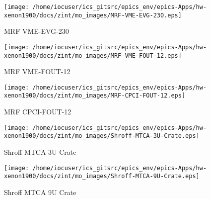 \noindent
\vspace{1.4cm}
\begin{minipage}{.2\textwidth}
\begin{center}
\texttt{[image: /home/iocuser/ics\_gitsrc/epics\_env/epics-Apps/hw-xenon1900/docs/zint/mo\_images/MRF-VME-EVG-230.eps]}
\end{center}
\end{minipage}
\begin{minipage}{.7\textwidth}
MRF VME-EVG-230
\end{minipage}


\noindent
\vspace{1.4cm}
\begin{minipage}{.2\textwidth}
\begin{center}
\texttt{[image: /home/iocuser/ics\_gitsrc/epics\_env/epics-Apps/hw-xenon1900/docs/zint/mo\_images/MRF-VME-FOUT-12.eps]}
\end{center}
\end{minipage}
\begin{minipage}{.7\textwidth}
MRF VME-FOUT-12
\end{minipage}


\noindent
\vspace{1.4cm}
\begin{minipage}{.2\textwidth}
\begin{center}
\texttt{[image: /home/iocuser/ics\_gitsrc/epics\_env/epics-Apps/hw-xenon1900/docs/zint/mo\_images/MRF-CPCI-FOUT-12.eps]}
\end{center}
\end{minipage}
\begin{minipage}{.7\textwidth}
MRF CPCI-FOUT-12
\end{minipage}


\noindent
\vspace{1.4cm}
\begin{minipage}{.2\textwidth}
\begin{center}
\texttt{[image: /home/iocuser/ics\_gitsrc/epics\_env/epics-Apps/hw-xenon1900/docs/zint/mo\_images/Shroff-MTCA-3U-Crate.eps]}
\end{center}
\end{minipage}
\begin{minipage}{.7\textwidth}
Shroff MTCA 3U Crate
\end{minipage}


\noindent
\vspace{1.4cm}
\begin{minipage}{.2\textwidth}
\begin{center}
\texttt{[image: /home/iocuser/ics\_gitsrc/epics\_env/epics-Apps/hw-xenon1900/docs/zint/mo\_images/Shroff-MTCA-9U-Crate.eps]}
\end{center}
\end{minipage}
\begin{minipage}{.7\textwidth}
Shroff MTCA 9U Crate
\end{minipage}


